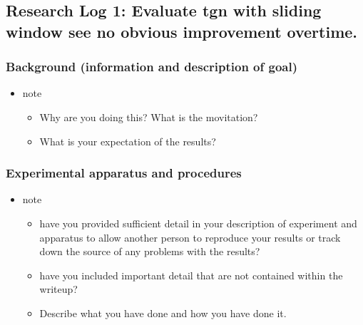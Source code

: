 \documentclass[11pt]{article}
\begin{document}
\subsection{Research Log 1: Evaluate tgn with sliding window see no obvious improvement overtime.}
\label{sec:org38d124f}
\subsubsection{Background (information and description of goal)}
\label{sec:org1336b17}
\begin{itemize}
\item note
\begin{itemize}
\item Why are you doing this? What is the movitation?
\item What is your expectation of the results?
\end{itemize}
\end{itemize}

\subsubsection{Experimental apparatus and procedures}
\label{sec:org02834e1}
\begin{itemize}
\item note
\begin{itemize}
\item have you provided sufficient detail in your description of experiment and apparatus to allow another person to reproduce your results or track down the source of any problems with the results?
\item have you included important detail that are not contained within the writeup?
\item Describe what you have done and how you have done it.
\end{itemize}
\end{itemize}
\end{document}
